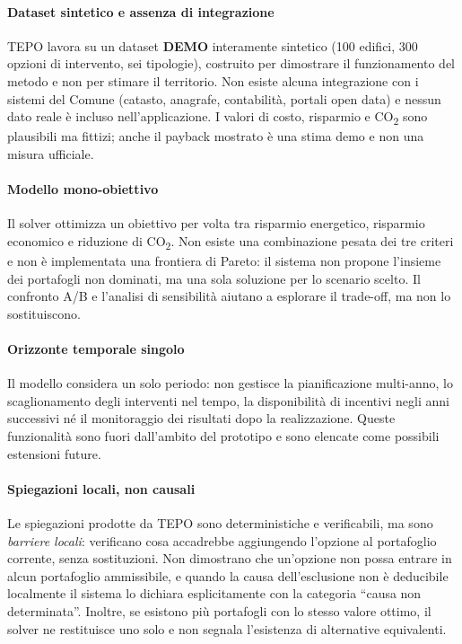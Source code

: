 \paragraph{Dataset sintetico e assenza di integrazione}
TEPO lavora su un dataset \textbf{DEMO} interamente sintetico (100 edifici, 300 opzioni di intervento, sei tipologie), costruito per dimostrare il funzionamento del metodo e non per stimare il territorio. Non esiste alcuna integrazione con i sistemi del Comune (catasto, anagrafe, contabilità, portali open data) e nessun dato reale è incluso nell'applicazione. I valori di costo, risparmio e CO\textsubscript{2} sono plausibili ma fittizi; anche il payback mostrato è una stima demo e non una misura ufficiale.

\paragraph{Modello mono-obiettivo}
Il solver ottimizza un obiettivo per volta tra risparmio energetico, risparmio economico e riduzione di CO\textsubscript{2}. Non esiste una combinazione pesata dei tre criteri e non è implementata una frontiera di Pareto: il sistema non propone l'insieme dei portafogli non dominati, ma una sola soluzione per lo scenario scelto. Il confronto A/B e l'analisi di sensibilità aiutano a esplorare il trade-off, ma non lo sostituiscono.

\paragraph{Orizzonte temporale singolo}
Il modello considera un solo periodo: non gestisce la pianificazione multi-anno, lo scaglionamento degli interventi nel tempo, la disponibilità di incentivi negli anni successivi né il monitoraggio dei risultati dopo la realizzazione. Queste funzionalità sono fuori dall'ambito del prototipo e sono elencate come possibili estensioni future.

\paragraph{Spiegazioni locali, non causali}
Le spiegazioni prodotte da TEPO sono deterministiche e verificabili, ma sono \emph{barriere locali}: verificano cosa accadrebbe aggiungendo l'opzione al portafoglio corrente, senza sostituzioni. Non dimostrano che un'opzione non possa entrare in alcun portafoglio ammissibile, e quando la causa dell'esclusione non è deducibile localmente il sistema lo dichiara esplicitamente con la categoria ``causa non determinata''. Inoltre, se esistono più portafogli con lo stesso valore ottimo, il solver ne restituisce uno solo e non segnala l'esistenza di alternative equivalenti.

